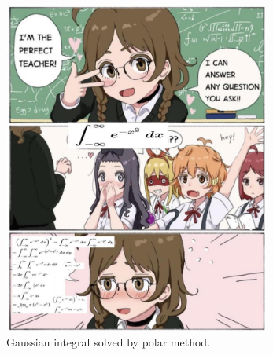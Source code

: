 \documentclass[../../main.tex]{subfiles}
\begin{document}
\begin{figure}
    \centering
    \includegraphics[width=0.78\textwidth]{../../../Rss/AnalyticsApproach/SFunc/9az27w9ge34e1.jpg}
    \caption{Gaussian integral solved by polar method.}
    \label{fig}
\end{figure}
\end{document}
